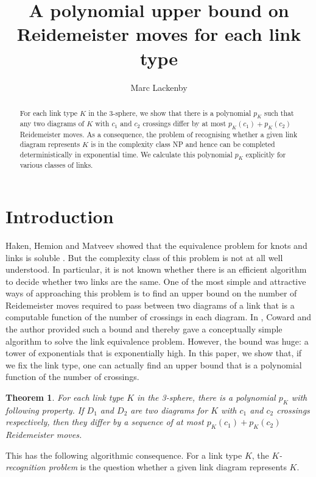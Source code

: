 \documentclass[oneside]{amsart}
\title[An upper bound on Reidemeister moves for each link type]{A polynomial upper bound on Reidemeister moves for each link type}
\author{Marc Lackenby}
\numberwithin{equation}{section}
\theoremstyle{plain}
\newtheorem{theorem}[equation]{Theorem}
\theoremstyle{definition}
\begin{document}
\begin{abstract} 
For each link type $K$ in the 3-sphere, we show that there is a polynomial $p_K$ such that any two diagrams of $K$ with $c_1$ and
$c_2$ crossings differ by at most $p_K(c_1) + p_K(c_2)$ Reidemeister moves. As a consequence, the problem of recognising
whether a given link diagram represents $K$ is in the complexity class NP and hence can be completed deterministically in exponential time. 
We calculate this polynomial $p_K$ explicitly for various classes  of links. 
\end{abstract}
\maketitle
\tableofcontents
\newpage

\section{Introduction}\label{Sec:Intro}

Haken, Hemion and Matveev showed that the equivalence problem for knots and links is soluble \cite{Haken, Hemion, Matveev}. But the complexity class
of this problem is not at all well understood. In particular, it is not known whether there is an
efficient algorithm to decide whether two links are the same. One of the most simple and attractive ways
of approaching this problem is to find an upper bound on the number of Reidemeister moves
required to pass between two diagrams of a link that is a computable function of the number
of crossings in each diagram. In \cite{CowardLackenby}, Coward and the author provided such a bound
and thereby gave a conceptually simple algorithm to solve the link equivalence problem. However, the bound
was huge: a tower of exponentials that is exponentially high. In this paper, we show that, if we fix the
link type, one can actually find an upper bound that is a polynomial function of the number of crossings.

\begin{theorem}
\label{Thm:Main}
For each link type $K$ in the 3-sphere, there is a polynomial $p_K$ with
following property. If $D_1$ and $D_2$ are two diagrams for $K$ with $c_1$ and $c_2$ crossings
respectively, then they differ by a sequence of at most $p_K(c_1) + p_K(c_2)$ Reidemeister moves.
\end{theorem}

This has the following algorithmic consequence. For a link type $K$, the \emph{$K$-recognition problem}
is the question whether a given link diagram represents $K$.
\end{document}
